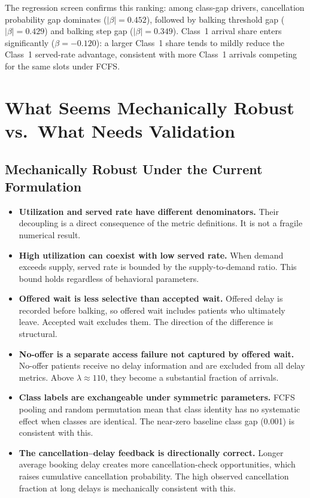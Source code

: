 \documentclass[11pt]{article}
\begin{document}
The regression screen confirms this ranking: among class-gap drivers,
cancellation probability gap dominates ($|\beta| = 0.452$), followed by
balking threshold gap ($|\beta| = 0.429$) and balking step gap
($|\beta| = 0.349$). Class~1 arrival share enters significantly
($\beta = -0.120$): a larger Class~1 share tends to mildly reduce the
Class~1 served-rate advantage, consistent with more Class~1 arrivals
competing for the same slots under FCFS.

\section{What Seems Mechanically Robust vs.\ What Needs Validation}
\label{sec:checks}

\subsection{Mechanically Robust Under the Current Formulation}

\begin{itemize}
\item \textbf{Utilization and served rate have different denominators.}
Their decoupling is a direct consequence of the metric definitions. It
is not a fragile numerical result.

\item \textbf{High utilization can coexist with low served rate.}
When demand exceeds supply, served rate is bounded by the supply-to-demand
ratio. This bound holds regardless of behavioral parameters.

\item \textbf{Offered wait is less selective than accepted wait.}
Offered delay is recorded before balking, so offered wait includes patients
who ultimately leave. Accepted wait excludes them. The direction of the
difference is structural.

\item \textbf{No-offer is a separate access failure not captured by
offered wait.} No-offer patients receive no delay information and are
excluded from all delay metrics. Above $\lambda \approx 110$, they become
a substantial fraction of arrivals.

\item \textbf{Class labels are exchangeable under symmetric parameters.}
FCFS pooling and random permutation mean that class identity has no
systematic effect when classes are identical. The near-zero baseline class
gap (0.001) is consistent with this.

\item \textbf{The cancellation--delay feedback is directionally correct.}
Longer average booking delay creates more cancellation-check opportunities,
which raises cumulative cancellation probability. The high observed
cancellation fraction at long delays is mechanically consistent with this.
\end{itemize}
\end{document}
